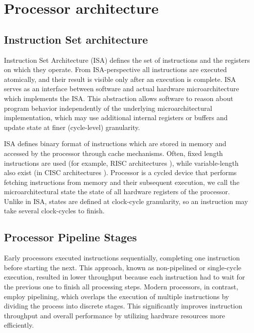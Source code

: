 \chapter{Processor architecture}
\label{chap:proc-arch}

\section{Instruction Set architecture}

Instruction Set Architecture (ISA) defines the set of instructions and the registers on which they operate. From ISA-perspective all instructions are executed atomically, and their result is visible only after an execution is complete. ISA serves as an interface between software and actual hardware microarchitecture which implements the ISA. This abstraction allows software to reason about program behavior independently of the underlying microarchitectural implementation, which may use additional internal registers or buffers and update state at finer (cycle-level) granularity.


ISA defines binary format of instructions which are stored in memory and accessed by the processor through cache mechanisms. Often, fixed length instructions are used (for example, RISC architectures ), while variable-length also exist (in CISC architectures ). Processor is a cycled device that performs fetching instructions from memory and their subsequent execution, we call the microarchitectural state the state of all hardware registers of the processor. Unlike in ISA, states are defined at clock-cycle granularity, so an instruction may take several clock-cycles to finish. 


\section{Processor Pipeline Stages}

Early processors executed instructions sequentially, completing one instruction before starting the next. This approach, known as non-pipelined or single-cycle execution, resulted in lower throughput because each instruction had to wait for the previous one to finish all processing steps. Modern processors, in contrast, employ pipelining, which overlaps the execution of multiple instructions by dividing the process into discrete stages. This significantly improves instruction throughput and overall performance by utilizing hardware resources more efficiently.

